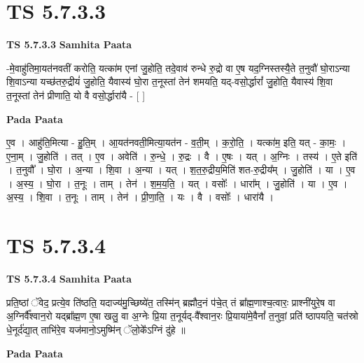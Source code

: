 \documentclass[17pt]{extarticle}
\begin{document}
\section*{ TS 5.7.3.3 }

\textbf{TS 5.7.3.3 } \newline
\textbf{Samhita Paata} \newline

-मे॒वाहु॑तिमा॒यत॑नवतीं करोति॒ यत्का॑म एनां जु॒होति॒ तदे॒वाव॑ रुन्धे रु॒द्रो वा ए॒ष यद॒ग्निस्तस्यै॒ते त॒नुवौ॑ घो॒राऽन्या शि॒वाऽन्या यच्छ॑तरु॒द्रीयं॑ जु॒होति॒ यैवास्य॑ घो॒रा त॒नूस्तां तेन॑ शमयति॒ यद्-वसो॒र्द्धारां᳚ जु॒होति॒ यैवास्य॑ शि॒वा त॒नूस्तां तेन॑ प्रीणाति॒ यो वै वसो॒र्द्धारा॑यै - [  ] \newline

\textbf{Pada Paata} \newline

ए॒व । आहु॑ति॒मित्या - हु॒ति॒म् । आ॒यत॑नवती॒मित्या॒यत॑न - व॒ती॒म् । क॒रो॒ति॒ । यत्का॑म॒ इति॒ यत् - का॒मः॒ । ए॒ना॒म् । जु॒होति॑ । तत् । ए॒व । अवेति॑ । रु॒न्धे॒ । रु॒द्रः । वै । ए॒षः । यत् । अ॒ग्निः । तस्य॑ । ए॒ते इति॑ । त॒नुवौ᳚ । घो॒रा । अ॒न्या । शि॒वा । अ॒न्या । यत् । श॒त॒रु॒द्रीय॒मिति॑ शत-रु॒द्रीय᳚म् । जु॒होति॑ । या । ए॒व । अ॒स्य॒ । घो॒रा । त॒नूः । ताम् । तेन॑ । श॒म॒य॒ति॒ । यत् । वसोः᳚ । धारा᳚म् । जु॒होति॑ । या । ए॒व । अ॒स्य॒ । शि॒वा । त॒नूः । ताम् । तेन॑ । प्री॒णा॒ति॒ । यः । वै । वसोः᳚ । धारा॑यै ।  \newline




\section*{ TS 5.7.3.4 }

\textbf{TS 5.7.3.4 } \newline
\textbf{Samhita Paata} \newline

प्रति॒ष्ठां ॅवेद॒ प्रत्ये॒व ति॑ष्ठति॒ यदाज्य॑मु॒च्छिष्ये॑त॒ तस्मि॑न् ब्रह्मौद॒नं प॑चे॒त् तं ब्रा᳚ह्म॒णाश्च॒त्वारः॒ प्राश्नी॑युरे॒ष वा अ॒ग्निर्वै᳚श्वान॒रो यद्ब्रा᳚ह्म॒ण ए॒षा खलु॒ वा अ॒ग्नेः प्रि॒या त॒नूर्यद्-वै᳚श्वान॒रः प्रि॒याया॑मे॒वैनां᳚ त॒नुवां॒ प्रति॑ ष्ठापयति॒ चत॑स्रो धे॒नूर्द॑द्या॒त् ताभि॑रे॒व यज॑मानो॒ऽमुष्मि॑न् ॅलो॒के᳚ऽग्निं दु॑हे ॥ \newline

\textbf{Pada Paata} \newline
\end{document}
